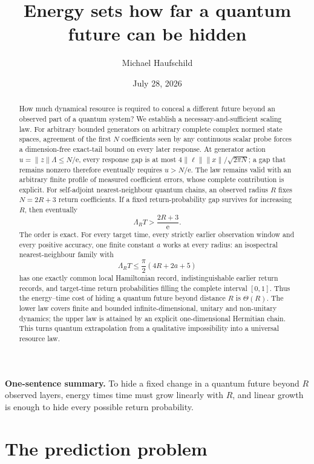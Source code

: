 \documentclass[10pt]{article}
\title{\bfseries Energy sets how far a quantum future can be hidden}
\author{Michael Haufschild}
\date{July 28, 2026}
\numberwithin{equation}{section}
\theoremstyle{definition}
\theoremstyle{remark}
\newcommand{\ee}{\mathrm e}
\newcommand{\norm}[1]{\lVert #1\rVert}
\begin{document}
\maketitle

\begin{abstract}
How much dynamical resource is required to conceal a different future beyond
an observed part of a quantum system?  We establish a necessary-and-sufficient
scaling law.  For arbitrary bounded generators on arbitrary complete complex
normed state spaces, agreement of the first \(N\) coefficients seen by any
continuous scalar probe forces a dimension-free exact-tail bound on every
later response.  At generator action \(u=\norm{z}\Lambda\le N/\ee\), every
response gap is at most \(4\norm{\ell}\norm{x}/\sqrt{2\pi N}\); a gap that
remains nonzero therefore eventually requires \(u>N/\ee\).  The law remains
valid with an arbitrary finite profile of measured coefficient errors, whose
complete contribution is explicit.  For self-adjoint nearest-neighbour
quantum chains, an observed radius \(R\) fixes \(N=2R+3\) return
coefficients.  If a fixed return-probability gap survives for increasing
\(R\), then eventually
\[
 \Lambda_R T>\frac{2R+3}{\ee}.
\]
The order is exact.  For every target time, every strictly earlier
observation window and every positive accuracy, one finite constant \(a\)
works at every radius: an isospectral nearest-neighbour family with
\[
 \Lambda_R T\le \frac{\pi}{2}(4R+2a+5)
\]
has one exactly common local Hamiltonian record, indistinguishable earlier
return records, and target-time return probabilities filling the complete
interval \([0,1]\).  Thus the energy--time cost of hiding a quantum future
beyond distance \(R\) is \(\Theta(R)\).  The lower law covers finite and
bounded infinite-dimensional, unitary and non-unitary dynamics; the upper
law is attained by an explicit one-dimensional Hermitian chain.  This turns
quantum extrapolation from a qualitative impossibility into a universal
resource law.
\end{abstract}

\noindent\textbf{One-sentence summary.}
To hide a fixed change in a quantum future beyond \(R\) observed layers,
energy times time must grow linearly with \(R\), and linear growth is enough
to hide every possible return probability.

\section{The prediction problem}
\end{document}
